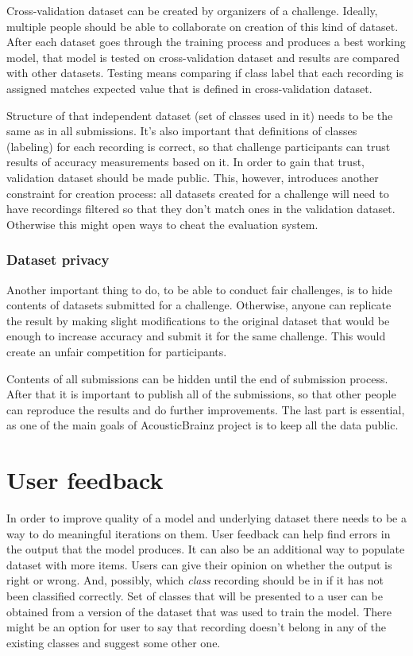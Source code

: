 Cross-validation dataset can be created by organizers of a challenge. Ideally, multiple people should be able to collaborate on creation of this kind of dataset. After each dataset goes through the training process and produces a best working model, that model is tested on cross-validation dataset and results are compared with other datasets. Testing means comparing if class label that each recording is assigned matches expected value that is defined in cross-validation dataset.

Structure of that independent dataset (set of classes used in it) needs to be the same as in all submissions. It's also important that definitions of classes (labeling) for each recording is correct, so that challenge participants can trust results of accuracy measurements based on it. In order to gain that trust, validation dataset should be made public. This, however, introduces another constraint for creation process: all datasets created for a challenge will need to have recordings filtered so that they don't match ones in the validation dataset. Otherwise this might open ways to cheat the evaluation system.

\subsubsection{Dataset privacy}

Another important thing to do, to be able to conduct fair challenges, is to hide contents of datasets submitted for a challenge. Otherwise, anyone can replicate the result by making slight modifications to the original dataset that would be enough to increase accuracy and submit it for the same challenge. This would create an unfair competition for participants.

Contents of all submissions can be hidden until the end of submission process. After that it is important to publish all of the submissions, so that other people can reproduce the results and do further improvements. The last part is essential, as one of the main goals of AcousticBrainz project is to keep all the data public.


\section{User feedback}

In order to improve quality of a model and underlying dataset there needs to be a way to do meaningful iterations on them. User feedback can help find errors in the output that the model produces. It can also be an additional way to populate dataset with more items. Users can give their opinion on whether the output is right or wrong. And, possibly, which \textit{class} recording should be in if it has not been classified correctly. Set of classes that will be presented to a user can be obtained from a version of the dataset that was used to train the model. There might be an option for user to say that recording doesn't belong in any of the existing classes and suggest some other one.


